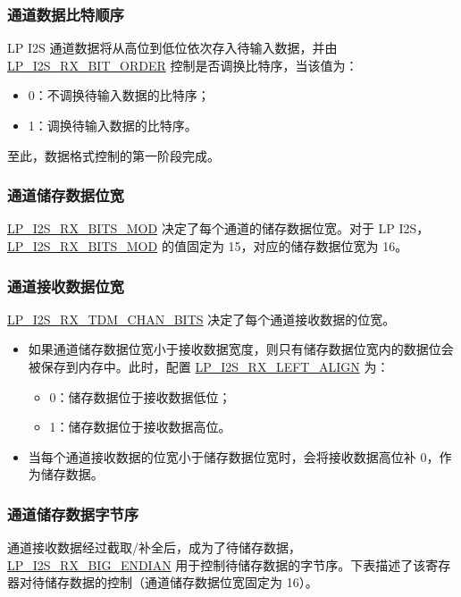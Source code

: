 \documentclass[main\_\_CN.tex]{subfiles}
\begin{document}
\subsubsection{通道数据比特顺序} 

\chipname{} LP I2S 通道数据将从高位到低位依次存入待输入数据，并由 \hyperref[fielddesc:LPI2SRXBITORDER]{LP\_I2S\_RX\_BIT\_ORDER} 控制是否调换比特序，当该值为：
\begin{itemize}
\item 0：不调换待输入数据的比特序；
\item 1：调换待输入数据的比特序。
\end{itemize}
至此，数据格式控制的第一阶段完成。

\subsubsection{通道储存数据位宽}

\hyperref[fielddesc:LPI2SRXBITSMOD]{LP\_I2S\_RX\_BITS\_MOD} 决定了每个通道的储存数据位宽。对于 \chipname{} LP I2S，\hyperref[fielddesc:LPI2SRXBITSMOD]{LP\_I2S\_RX\_BITS\_MOD} 的值固定为 15，对应的储存数据位宽为 16。

\subsubsection{通道接收数据位宽} 

\hyperref[fielddesc:LPI2SRXTDMCHANBITS]{LP\_I2S\_RX\_TDM\_CHAN\_BITS} 决定了每个通道接收数据的位宽。

\begin{itemize}
\item 如果通道储存数据位宽小于接收数据宽度，则只有储存数据位宽内的数据位会被保存到内存中。此时，配置 \hyperref[fielddesc:LPI2SRXLEFTALIGN]{LP\_I2S\_RX\_LEFT\_ALIGN} 为：
\begin{itemize}
\item 0：储存数据位于接收数据低位；
\item 1：储存数据位于接收数据高位。
\end{itemize}
\item 当每个通道接收数据的位宽小于储存数据位宽时，会将接收数据高位补 0，作为储存数据。
\end{itemize}

\subsubsection{通道储存数据字节序} 

通道接收数据经过截取/补全后，成为了待储存数据，\hyperref[fielddesc:LPI2SRXBIGENDIAN]{LP\_I2S\_RX\_BIG\_ENDIAN} 用于控制待储存数据的字节序。下表描述了该寄存器对待储存数据的控制（通道储存数据位宽固定为 16）。
\end{document}
